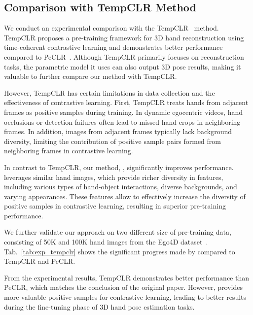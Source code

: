 \subsection{Comparison with TempCLR Method}



We conduct an experimental comparison with the TempCLR~\citep{ziani:3dv22} method. TempCLR proposes a pre-training framework for 3D hand reconstruction using time-coherent contrastive learning and demonstrates better performance compared to PeCLR~\citep{spurr:iccv21}. Although TempCLR primarily focuses on reconstruction tasks, the parametric model it uses can also output 3D pose results, making it valuable to further compare our method with TempCLR.

However, TempCLR has certain limitations in data collection and the effectiveness of contrastive learning. First, TempCLR treats hands from adjacent frames as positive samples during training. In dynamic egocentric videos, hand occlusions or detection failures often lead to missed hand crops in neighboring frames. In addition, images from adjacent frames typically lack background diversity, limiting the contribution of positive sample pairs formed from neighboring frames in contrastive learning.

In contrast to TempCLR, our method, \Ours, significantly improves performance. \Ours leverages similar hand images, which provide richer diversity in features, including various types of hand-object interactions, diverse backgrounds, and varying appearances. These features allow \Ours to effectively increase the diversity of positive samples in contrastive learning, resulting in superior pre-training performance.

We further validate our approach on two different size of pre-training data, consisting of 50K and 100K hand images from the Ego4D dataset~\citep{grauman:cvpr22}. Tab.~\ref{tab:exp_tempclr} shows the significant progress made by \Ours compared to TempCLR and PeCLR.

From the experimental results, TempCLR demonstrates better performance than PeCLR, which matches the conclusion of the original paper. However, \Ours provides more valuable positive samples for contrastive learning, leading to better results during the fine-tuning phase of 3D hand pose estimation tasks.